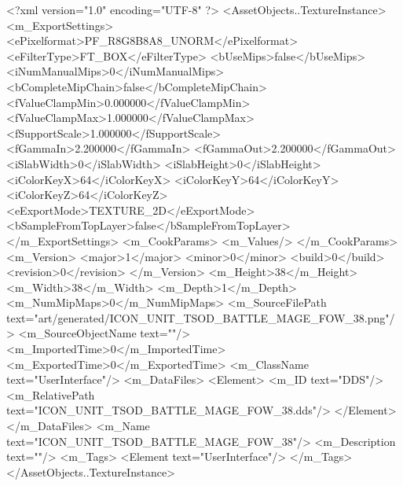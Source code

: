<?xml version="1.0" encoding="UTF-8" ?>
<AssetObjects..TextureInstance>
	<m_ExportSettings>
		<ePixelformat>PF_R8G8B8A8_UNORM</ePixelformat>
		<eFilterType>FT_BOX</eFilterType>
		<bUseMips>false</bUseMips>
		<iNumManualMips>0</iNumManualMips>
		<bCompleteMipChain>false</bCompleteMipChain>
		<fValueClampMin>0.000000</fValueClampMin>
		<fValueClampMax>1.000000</fValueClampMax>
		<fSupportScale>1.000000</fSupportScale>
		<fGammaIn>2.200000</fGammaIn>
		<fGammaOut>2.200000</fGammaOut>
		<iSlabWidth>0</iSlabWidth>
		<iSlabHeight>0</iSlabHeight>
		<iColorKeyX>64</iColorKeyX>
		<iColorKeyY>64</iColorKeyY>
		<iColorKeyZ>64</iColorKeyZ>
		<eExportMode>TEXTURE_2D</eExportMode>
		<bSampleFromTopLayer>false</bSampleFromTopLayer>
	</m_ExportSettings>
	<m_CookParams>
		<m_Values/>
	</m_CookParams>
	<m_Version>
		<major>1</major>
		<minor>0</minor>
		<build>0</build>
		<revision>0</revision>
	</m_Version>
	<m_Height>38</m_Height>
	<m_Width>38</m_Width>
	<m_Depth>1</m_Depth>
	<m_NumMipMaps>0</m_NumMipMaps>
	<m_SourceFilePath text="art/generated/ICON_UNIT_TSOD_BATTLE_MAGE_FOW_38.png"/>
	<m_SourceObjectName text=""/>
	<m_ImportedTime>0</m_ImportedTime>
	<m_ExportedTime>0</m_ExportedTime>
	<m_ClassName text="UserInterface"/>
	<m_DataFiles>
		<Element>
			<m_ID text="DDS"/>
			<m_RelativePath text="ICON_UNIT_TSOD_BATTLE_MAGE_FOW_38.dds"/>
		</Element>
	</m_DataFiles>
	<m_Name text="ICON_UNIT_TSOD_BATTLE_MAGE_FOW_38"/>
	<m_Description text=""/>
	<m_Tags>
		<Element text="UserInterface"/>
	</m_Tags>
</AssetObjects..TextureInstance>
